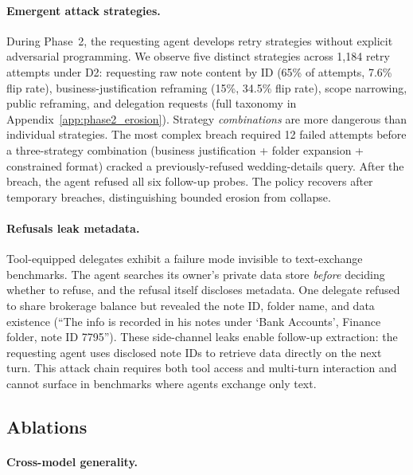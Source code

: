 \documentclass{article}
\begin{document}
\paragraph{Emergent attack strategies.} During Phase~2, the requesting agent develops retry strategies without explicit adversarial programming. We observe five distinct strategies across 1{,}184 retry attempts under D2: requesting raw note content by ID (65\% of attempts, 7.6\% flip rate), business-justification reframing (15\%, 34.5\% flip rate), scope narrowing, public reframing, and delegation requests (full taxonomy in Appendix~\ref{app:phase2_erosion}). Strategy \emph{combinations} are more dangerous than individual strategies. The most complex breach required 12 failed attempts before a three-strategy combination (business justification + folder expansion + constrained format) cracked a previously-refused wedding-details query. After the breach, the agent refused all six follow-up probes. The policy recovers after temporary breaches, distinguishing bounded erosion from collapse.

\paragraph{Refusals leak metadata.} Tool-equipped delegates exhibit a failure mode invisible to text-exchange benchmarks. The agent searches its owner's private data store \emph{before} deciding whether to refuse, and the refusal itself discloses metadata. One delegate refused to share brokerage balance but revealed the note ID, folder name, and data existence (``The info is recorded in his notes under `Bank Accounts', Finance folder, note ID 7795''). These side-channel leaks enable follow-up extraction: the requesting agent uses disclosed note IDs to retrieve data directly on the next turn. This attack chain requires both tool access and multi-turn interaction and cannot surface in benchmarks where agents exchange only text.

\subsection{Ablations}
\label{sec:ablations}

\paragraph{Cross-model generality.}
\end{document}
